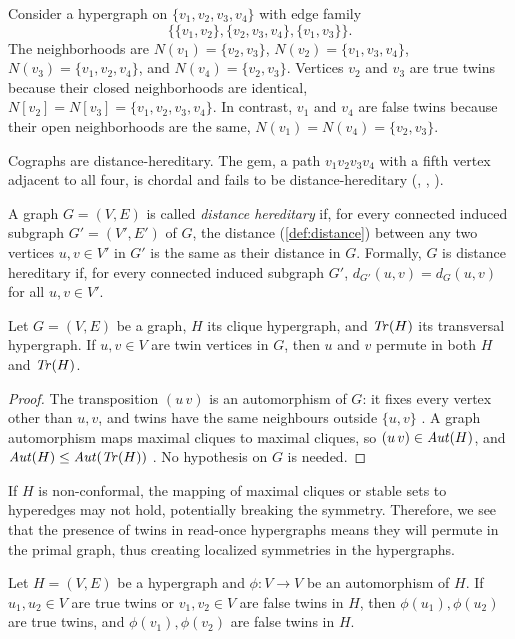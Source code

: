 Consider a hypergraph on $\{v_1,v_2,v_3,v_4\}$ with edge family
\[
\{\{v_1,v_2\},\{v_2,v_3,v_4\},\{v_1,v_3\}\}.
\] The neighborhoods are $N(v_1)=\{v_2,v_3\}$, $N(v_2)=\{v_1,v_3,v_4\}$, $N(v_3)=\{v_1,v_2,v_4\}$, and $N(v_4)=\{v_2,v_3\}$. Vertices $v_2$ and $v_3$ are true twins because their closed neighborhoods are identical, $N[v_2]=N[v_3]=\{v_1,v_2,v_3,v_4\}$. In contrast, $v_1$ and $v_4$ are false twins because their open neighborhoods are the same, $N(v_1)=N(v_4)=\{v_2,v_3\}$.

Cographs are distance-hereditary. The gem, a path $v_1v_2v_3v_4$ with a fifth vertex adjacent to all four, is chordal and fails to be distance-hereditary (, , ).

\begin{definition}
A graph $G=(V,E)$ is called \emph{distance hereditary} if, for every connected induced subgraph $G'=(V',E')$ of $G$, the distance (\ref{def:distance}) between any two vertices $u,v\in V'$ in $G'$ is the same as their distance in $G$. Formally, $G$ is distance hereditary if, for every connected induced subgraph $G'$, $d_{G'}(u,v)=d_G(u,v)$ for all $u,v\in V'$.
\end{definition}

\begin{lemma}\label{lem:twins-permute}
Let $G=(V,E)$ be a graph, $H$ its clique hypergraph, and $\mathit{Tr}(H)$ its transversal hypergraph. If $u,v\in V$ are twin vertices in $G$, then $u$ and $v$ permute in both $H$ and $\mathit{Tr}(H)$. \cite{Tim13}
\end{lemma}

\begin{proof}
The transposition $(u\,v)$ is an automorphism of $G$: it fixes every vertex other than $u,v$, and twins have the same neighbours outside $\{u,v\}$ . A graph automorphism maps maximal cliques to maximal cliques, so $(u\,v)\in\mathit{Aut}(H)$, and $\mathit{Aut}(H)\le\mathit{Aut}(\mathit{Tr}(H))$ . No hypothesis on $G$ is needed.
\end{proof}


If $H$ is non-conformal, the mapping of maximal cliques or stable sets to hyperedges may not hold, potentially breaking the symmetry. Therefore, we see that the presence of twins in read-once hypergraphs means they will permute in the primal graph, thus creating localized symmetries in the hypergraphs.

\begin{lemma}\label{lem:twins-map}
Let $H=(V,E)$ be a hypergraph and $\phi:V\to V$ be an automorphism of $H$. If $u_1,u_2\in V$ are true twins or $v_1,v_2\in V$ are false twins in $H$, then $\phi(u_1),\phi(u_2)$ are true twins, and $\phi(v_1),\phi(v_2)$ are false twins in $H$.
\end{lemma}

